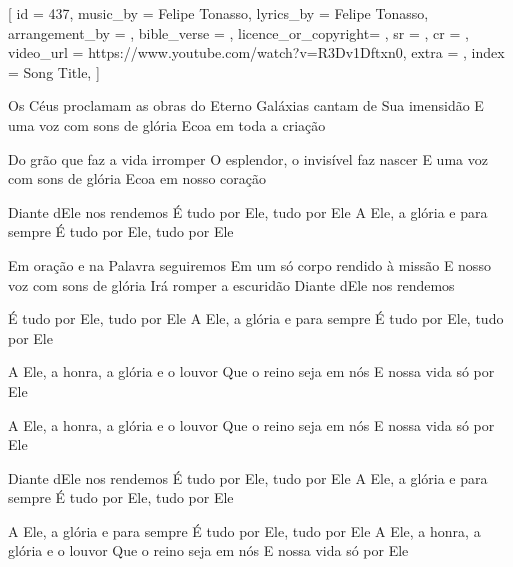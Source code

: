 [
    id                  = {437},
    music_by            = {Felipe Tonasso}, %
    lyrics_by           = {Felipe Tonasso}, %
    arrangement_by      = {}, %
    bible_verse         = {},
    licence_or_copyright= {},
    sr                  = {},
    cr                  = {},
    video_url           = {https://www.youtube.com/watch?v=R3Dv1Dftxn0}, %
    extra               = {},
    index               = {Song Title},
]

\beginverse
Os Céus proclamam as obras do Eterno
Galáxias cantam de Sua imensidão
E uma voz com sons de glória
Ecoa em toda a criação
\endverse

\beginverse
Do grão que faz a vida irromper
O esplendor, o invisível faz nascer
E uma voz com sons de glória
Ecoa em nosso coração
\endverse

\beginverse
Diante dEle nos rendemos
É tudo por Ele, tudo por Ele
A Ele, a glória e para sempre
É tudo por Ele, tudo por Ele
\endverse

\beginverse
Em oração e na Palavra seguiremos
Em um só corpo rendido à missão
E nosso voz com sons de glória
Irá romper a escuridão
Diante dEle nos rendemos
\endverse

\beginverse
É tudo por Ele, tudo por Ele
A Ele, a glória e para sempre
É tudo por Ele, tudo por Ele
\endverse

\beginverse
A Ele, a honra, a glória e o louvor
Que o reino seja em nós
E nossa vida só por Ele

A Ele, a honra, a glória e o louvor
Que o reino seja em nós
E nossa vida só por Ele
\endverse

\beginverse
Diante dEle nos rendemos
É tudo por Ele, tudo por Ele
A Ele, a glória e para sempre
É tudo por Ele, tudo por Ele
\endverse

\beginverse
A Ele, a glória e para sempre
É tudo por Ele, tudo por Ele
A Ele, a honra, a glória e o louvor
Que o reino seja em nós
E nossa vida só por Ele
\endverse

\beginchorus

\endchorus

\endsong

